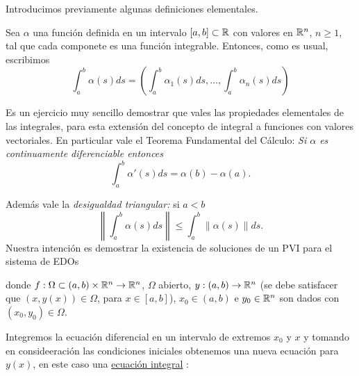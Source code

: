 Introducimos previamente algunas definiciones elementales.

\begin{definicion}
 Sea $\alpha$ una función  definida en un intervalo $[a,b]\subset \rr$ con valores en $\rr^n$, $n\geq 1$, tal que cada componete es una función integrable. Entonces, como es usual, escribimos
 \[\int_a^b\alpha(s)ds=\left(\int_a^b\alpha_1(s)ds,\ldots,\int_a^b\alpha_n(s)ds\right) \]
\end{definicion}

Es un ejercicio muy sencillo  demostrar que vales las propiedades elementales de las integrales, para esta extensión del concepto de integral a funciones con valores vectoriales. En particular vale el Teorema Fundamental del Cálculo: \emph{Si $\alpha$ es continuamente diferenciable entonces
\[ \int_a^b\alpha'(s)ds=\alpha(b)-\alpha(a).\]
}

Además vale la \emph{desigualdad triangular:} si $a<b$
\[\left\|\int_a^b \alpha(s)ds\right\|\leq \int_a^b \left\|\alpha(s)\right\|ds.\]
Nuestra intención es demostrar la existencia de soluciones de un PVI para el sistema de EDOs

donde $f:\Omega \subset (a,b)\times \rr^n\to \rr^n$, $\Omega$ abierto, $y:(a,b)\to \rr^n$ (se debe satisfacer que $(x,y(x))\in \Omega$, para $x\in [a,b]$), $x_0\in (a,b)$
e $y_0\in\rr^n$ son dados con $(x_0,y_0)\in \Omega$.



Integremos la ecuación diferencial en un intervalo de extremos $x_0$ y $x$ y tomando en consideeración las condiciones iniciales obtenemos una nueva ecuación para $y(x)$,  en este caso una \href{https://es.wikipedia.org/wiki/Ecuaci%C3%B3n_integral}{ecuación integral} :



